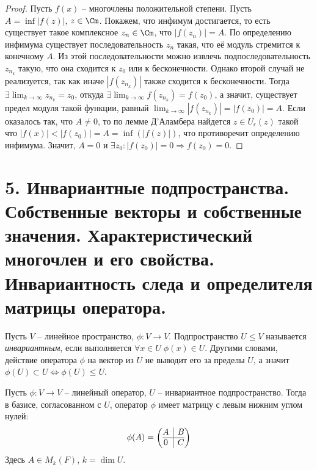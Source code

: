 \begin{proof}
    Пусть $f(x)$ -- многочлены положительной степени. Пусть $A = \inf|f(z)|$, $z \in \Cm$. Покажем, что инфимум достигается, то есть существует такое комплексное $z_n \in \Cm$, что $|f(z_n)| = A$. По определению инфимума существует последовательность ${z_n}$ такая, что её модуль стремится к конечному $A$. Из этой последовательности можно извлечь
    подпоследовательность ${z_{n_k}}$ такую, что она сходится к $z_0$ или к бесконечности. Однако второй случай не реализуется, так как иначе $|f(z_{n_k})|$ также сходится к бесконечности. Тогда $\exists \lim_{k\to \infty} {z_{n_k}} = z_0$, откуда $\exists \lim_{k\to \infty} {f(z_{n_k})} = f(z_0)$, а значит, существует предел модуля такой функции, равный $\lim_{k\to \infty} {|f(z_{n_k})|} = |f(z_0)| = A$. Если оказалось так, что $A \neq 0$, то по лемме Д'Аламбера найдется $z \in U_{\epsilon}(z)$ такой что $|f(x)| < |f(z_0)| = A = \inf(|f(z)|)$, что противоречит определению инфимума. Значит, $A = 0$ и $\exists z_{0}: |f(z_{0})| = 0 \Rightarrow f(z_{0}) = 0$.
\end{proof}

\section{5. Инвариантные подпространства. Собственные векторы и собственные значения. Характеристический многочлен и его свойства. Инвариантность следа и определителя матрицы оператора.}

\begin{definition}
    Пусть $V$ -- линейное пространство, $\phi: V \to V$. Подпространство $U \leq V$ называется 
    \textit{инвариантным}, если выполняется $\forall x \in U \; \phi(x) \in U$. Другими словами, действие 
    оператора $\phi$ на вектор из $U$ не выводит его за пределы $U$, а значит 
    $\phi(U) \subset U \Leftrightarrow \phi(U) \leq U$.
\end{definition}

\begin{proposition}
    Пусть $\phi: V \to V$ -- линейный оператор, $U$ -- инвариантное подпространство. Тогда в базисе, 
    согласованном с $U$, оператор $\phi$ имеет матрицу с левым нижним углом нулей:
    \[\phi(A) = \left(\begin{array}{@{}c|c@{}}
        A & B\\
        \hline
        0 & C
    \end{array}\right)\]
    Здесь $A \in M_k(F)$, $k = \dim U$.
\end{proposition}

